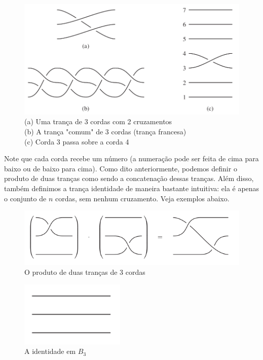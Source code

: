 \documentclass[a4paper,portuguese,11pt,twoside, leqno]{book}
\theoremstyle{definition}
\begin{document}
	\begin{figure}[H]
		\captionsetup{justification=centering}
		\begin{center}
			\includegraphics[width=12cm]{exemplos_diagrama.png}
			\caption{
				(a) Uma trança de 3 cordas com 2 cruzamentos \\
				(b) A trança "comum" de 3 cordas (trança francesa) \\
				(c) Corda 3 passa sobre a corda 4
			}\label{diagramas de trancas}\end{center}
	\end{figure}
	
	\par\vspace{0.3cm} Note que cada corda recebe um número (a numeração pode ser feita de cima para baixo ou de baixo para cima). Como dito anteriormente, podemos definir o produto de duas tranças como sendo a concatenação dessas tranças. Além disso, também definimos a trança identidade de maneira bastante intuitiva: ela é apenas o conjunto de $n$ cordas, sem nenhum cruzamento. Veja exemplos abaixo.
	
	\begin{figure}[H]
		\captionsetup{justification=centering}
		\begin{center}
			\includegraphics[width=12cm]{produto.png}
		\end{center}\caption{O produto de duas tranças de 3 cordas
		}\label{produto de trancas}
	\end{figure}
	
	\begin{figure}[H]
		\captionsetup{justification=centering}
		\begin{center}
			\includegraphics[width=5cm]{identidade_b3.png}
		\end{center}\caption{A identidade em $B_3$}\label{identidade em b3}
	\end{figure}
	
\end{document}
